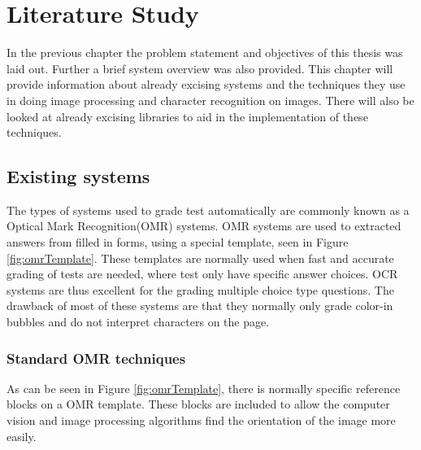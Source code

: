 \chapter{Literature Study}
\label{ch:LiteratureStudy}
    \graphicspath{{Chapter2/Chapter2Figures/}}

In the previous chapter the problem statement and objectives of this thesis was laid out. Further a brief system overview was also provided.
This chapter will provide information about already excising systems and the techniques they use in doing image processing and character recognition on images. There will also be looked at already excising libraries to aid in the implementation of these techniques.

\section{Existing systems}
The types of systems used to grade test automatically are commonly known as a Optical Mark Recognition(OMR) systems. OMR systems are used to extracted answers from filled in forms, using a special template, seen in Figure \ref{fig:omrTemplate}. These templates are normally used when fast and accurate grading of tests are needed, where test only have specific answer choices. OCR systems are thus excellent for the grading multiple choice type questions. The drawback of most of these systems are  that they normally only grade color-in bubbles and do not interpret characters on the page.

\subsection{Standard OMR techniques}
\label{sec:StandardTech}
As can be seen in Figure \ref{fig:omrTemplate}, there is normally specific reference blocks on a OMR template. These blocks are included to allow the computer vision and image processing algorithms find the orientation of the image more easily.

